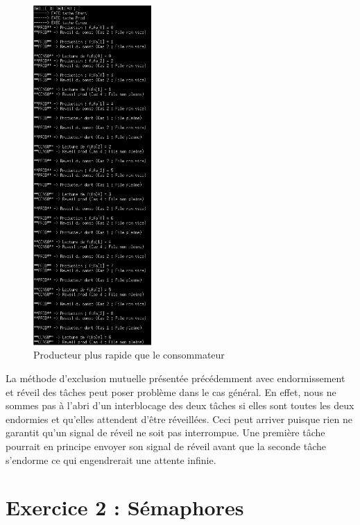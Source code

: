 \documentclass[a4paper,12pt]{report}
\begin{document}
\newpage

\begin{figure}[h]
	\centering
		\includegraphics[width=0.4\textwidth]{screens/prod_plus_rapide_sem.png}
		\caption{Producteur plus rapide que le consommateur}
		\label{prod_plus_rapide}
\end{figure}

\newpage

La méthode d'exclusion mutuelle présentée précédemment avec endormissement et réveil des tâches peut poser problème dans le cas général. En effet, nous ne sommes pas à l'abri d'un interblocage des deux tâches si elles sont toutes les deux endormies et qu'elles attendent d'être réveillées. Ceci peut arriver puisque rien ne garantit qu'un signal de réveil ne soit pas interrompue. Une première tâche pourrait en principe envoyer son signal de réveil avant que la seconde tâche s'endorme ce qui engendrerait une attente infinie.

\section{Exercice 2 : Sémaphores}
\end{document}
